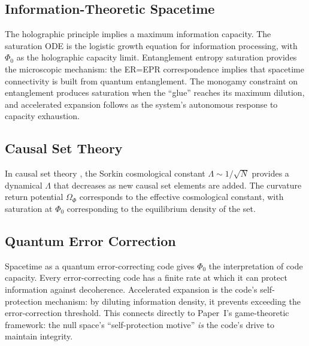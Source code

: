 \documentclass[aps,prd,twocolumn,superscriptaddress,nofootinbib]{revtex4-2}
\begin{document}
\subsection{Information-Theoretic Spacetime}
The holographic principle \cite{Bousso2002} implies a maximum information capacity. The saturation ODE is the logistic growth equation for information processing, with $\Phi_0$ as the holographic capacity limit. Entanglement entropy saturation \cite{VanRaamsdonk2010} provides the microscopic mechanism: the ER=EPR correspondence \cite{Maldacena2013} implies that spacetime connectivity is built from quantum entanglement. The monogamy constraint on entanglement produces saturation when the ``glue'' reaches its maximum dilution, and accelerated expansion follows as the system's autonomous response to capacity exhaustion.

\subsection{Causal Set Theory}
In causal set theory \cite{Bombelli1987, Sorkin2003}, the Sorkin cosmological constant \cite{Sorkin1991} $\Lambda \sim 1/\sqrt{N}$ provides a dynamical $\Lambda$ that decreases as new causal set elements are added. The curvature return potential $\Omega_\Phi$ corresponds to the effective cosmological constant, with saturation at $\Phi_0$ corresponding to the equilibrium density of the set.

\subsection{Quantum Error Correction}
Spacetime as a quantum error-correcting code \cite{Almheiri2015, Pastawski2015} gives $\Phi_0$ the interpretation of code capacity. Every error-correcting code has a finite rate at which it can protect information against decoherence. Accelerated expansion is the code's self-protection mechanism: by diluting information density, it prevents exceeding the error-correction threshold. This connects directly to Paper~I's game-theoretic framework: the null space's ``self-protection motive'' \textit{is} the code's drive to maintain integrity.
\end{document}

